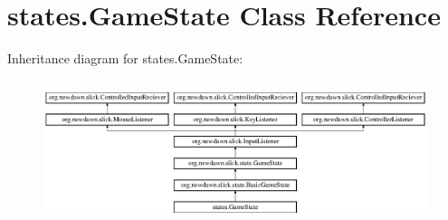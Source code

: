 \hypertarget{classstates_1_1_game_state}{}\section{states.\+Game\+State Class Reference}
\label{classstates_1_1_game_state}
Inheritance diagram for states.\+Game\+State\+:\begin{figure}[H]
\begin{center}
\leavevmode
\includegraphics[height=4.226415cm]{classstates_1_1_game_state}
\end{center}
\end{figure}
